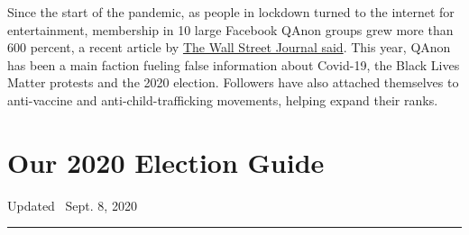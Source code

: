 Since the start of the pandemic, as people in lockdown turned to the
internet for entertainment, membership in 10 large Facebook QAnon groups
grew more than 600 percent, a recent article by
\href{https://www.wsj.com/articles/qanon-booms-on-facebook-as-conspiracy-group-gains-mainstream-traction-11597367457}{The
Wall Street Journal said}. This year, QAnon has been a main faction
fueling false information about Covid-19, the Black Lives Matter
protests and the 2020 election. Followers have also attached themselves
to anti-vaccine and anti-child-trafficking movements, helping expand
their ranks.

\hypertarget{our-2020-election-guide}{%
\section{Our 2020 Election Guide}\label{our-2020-election-guide}}

Updated ~Sept. 8, 2020

\begin{center}\rule{0.5\linewidth}{\linethickness}\end{center}

